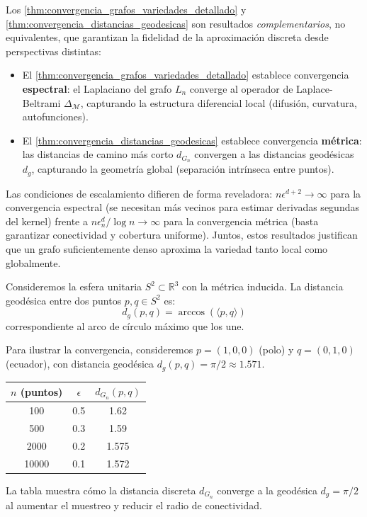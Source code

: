 \begin{remark}\label{rem:complementariedad_convergencias}
Los \autoref{thm:convergencia_grafos_variedades_detallado} y \autoref{thm:convergencia_distancias_geodesicas} son resultados \emph{complementarios}, no equivalentes, que garantizan la fidelidad de la aproximación discreta desde perspectivas distintas:
\begin{itemize}
	\item El \autoref{thm:convergencia_grafos_variedades_detallado} establece convergencia \textbf{espectral}: el Laplaciano del grafo $L_n$ converge al operador de Laplace-Beltrami $\Delta_\mathcal{M}$, capturando la estructura diferencial local (difusión, curvatura, autofunciones).
	\item El \autoref{thm:convergencia_distancias_geodesicas} establece convergencia \textbf{métrica}: las distancias de camino más corto $d_{G_n}$ convergen a las distancias geodésicas $d_g$, capturando la geometría global (separación intrínseca entre puntos).
\end{itemize}
Las condiciones de escalamiento difieren de forma reveladora: $n\epsilon^{d+2} \to \infty$ para la convergencia espectral (se necesitan más vecinos para estimar derivadas segundas del kernel) frente a $n\epsilon_n^d / \log n \to \infty$ para la convergencia métrica (basta garantizar conectividad y cobertura uniforme). Juntos, estos resultados justifican que un grafo suficientemente denso aproxima la variedad tanto local como globalmente.
\end{remark}

\begin{example}\label{ex:geodesicas_discretas_esfera}
	Consideremos la esfera unitaria $S^2 \subset \mathbb{R}^3$ con la métrica inducida. La distancia geodésica entre dos puntos $p, q \in S^2$ es:
	\[
		d_g(p, q) = \arccos(\langle p, q \rangle)
	\]
	correspondiente al arco de círculo máximo que los une.

	Para ilustrar la convergencia, consideremos $p = (1, 0, 0)$ (polo) y $q = (0, 1, 0)$ (ecuador), con distancia geodésica $d_g(p, q) = \pi/2 \approx 1.571$.

	\begin{center}
	\begin{tabular}{ccc}
		\toprule
		$n$ (puntos) & $\epsilon$ & $d_{G_n}(p, q)$ \\
		\midrule
		100 & 0.5 & 1.62 \\
		500 & 0.3 & 1.59 \\
		2000 & 0.2 & 1.575 \\
		10000 & 0.1 & 1.572 \\
		\bottomrule
	\end{tabular}
	\end{center}

	La tabla muestra cómo la distancia discreta $d_{G_n}$ converge a la geodésica $d_g = \pi/2$ al aumentar el muestreo y reducir el radio de conectividad.
\end{example}

